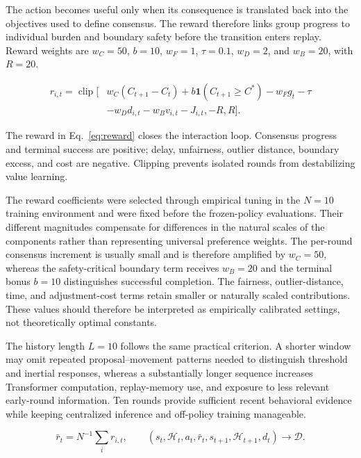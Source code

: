 \documentclass[journal]{IEEEtran}
\newcommand{\clip}{\operatorname{clip}}
\newcommand{\eqnote}[1]{\par\vspace{-0.3ex}\noindent #1\par\vspace{0.4ex}}
\begin{document}
The action becomes useful only when its consequence is translated back into the objectives used to define consensus. The reward therefore links group progress to individual burden and boundary safety before the transition enters replay. Reward weights are $w_C=50$, $b=10$, $w_F=1$, $\tau=0.1$, $w_D=2$, and $w_B=20$, with $R=20$.

\begin{equation}
\begin{aligned}
r_{i,t}=\clip\big[&w_C(C_{t+1}-C_t)
+b\mathbf{1}(C_{t+1}\ge C^*)-w_Fg_t-\tau\\
&-w_Dd_{i,t}-w_Bv_{i,t}-J_{i,t},-R,R\big].
\end{aligned}
\label{eq:reward}
\end{equation}

\eqnote{The reward in Eq.~\eqref{eq:reward} closes the interaction loop. Consensus progress and terminal success are positive; delay, unfairness, outlier distance, boundary excess, and cost are negative. Clipping prevents isolated rounds from destabilizing value learning.}

The reward coefficients were selected through empirical tuning in the $N=10$ training environment and were fixed before the frozen-policy evaluations. Their different magnitudes compensate for differences in the natural scales of the components rather than representing universal preference weights. The per-round consensus increment is usually small and is therefore amplified by $w_C=50$, whereas the safety-critical boundary term receives $w_B=20$ and the terminal bonus $b=10$ distinguishes successful completion. The fairness, outlier-distance, time, and adjustment-cost terms retain smaller or naturally scaled contributions. These values should therefore be interpreted as empirically calibrated settings, not theoretically optimal constants.

The history length $L=10$ follows the same practical criterion. A shorter window may omit repeated proposal--movement patterns needed to distinguish threshold and inertial responses, whereas a substantially longer sequence increases Transformer computation, replay-memory use, and exposure to less relevant early-round information. Ten rounds provide sufficient recent behavioral evidence while keeping centralized inference and off-policy training manageable.

\begin{equation}
\bar r_t=N^{-1}\sum_i r_{i,t},\qquad
(s_t,\mathcal H_t,a_t,\bar r_t,s_{t+1},\mathcal H_{t+1},d_t)\rightarrow\mathcal D.
\label{eq:replay}
\end{equation}
\end{document}
